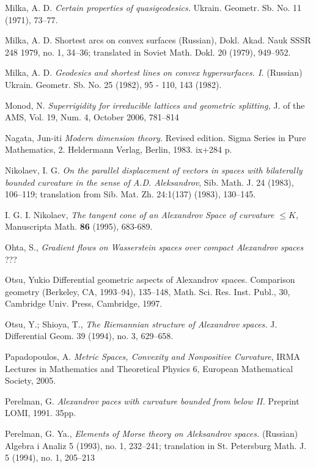 \begin{thebibliography}{52}
Milka, A. D. \textit{Certain properties of quasigeodesics.} 
Ukrain. Geometr. Sb. No. 11 (1971), 73--77.

 {Milka, A. D.} {Shortest arcs on convex surfaces} (Russian),  {Dokl. Akad.
Nauk SSSR}  {248}  {1979}, {no. 1}, {34--36};  translated in  Soviet Math. Dokl. 20 (1979), 949--952.

 Milka, A. D.  \textit{Geodesics and shortest lines on convex hypersurfaces.  I.}  (Russian)   Ukrain. Geometr. Sb. No. 25
(1982), 95 - 110, 143 (1982).

 Monod, N. \textit{Superrigidity for irreducible lattices and geometric splitting,} J. of the AMS,
Vol. 19, Num. 4, October 2006, 781--814

 Nagata, Jun-iti \textit{Modern dimension theory.} Revised edition. Sigma Series in Pure Mathematics, 2. Heldermann Verlag, Berlin, 1983. ix+284 p.

 Nikolaev, I. G. \textit{On the parallel displacement of vectors in spaces with
bilaterally bounded curvature in the sense of A.D. Aleksandrov}, Sib. Math.
J. 24 (1983), 106--119; translation from Sib. Mat. Zh. 24:1(137) (1983), 130--145.

 I. G. I. Nikolaev, {\em The tangent cone of an Alexandrov Space of curvature $\le K$}, Manuscripta Math. {\bf 86} (1995), 683-689.

 Ohta, S., \textit{Gradient flows on Wasserstein spaces
over compact Alexandrov spaces} ???

 Otsu, Yukio Differential geometric aspects of Alexandrov spaces.  Comparison
geometry (Berkeley, CA, 1993--94),  135--148, Math. Sci. Res. Inst. Publ., 30,
Cambridge Univ. Press, Cambridge, 1997.

 Otsu, Y.; Shioya, T., \textit{The Riemannian structure of Alexandrov spaces.}  J. Differential Geom.  39  (1994),  no. 3, 629--658.

  Papadopoulos, A.
\textit{Metric Spaces, Convexity and Nonpositive Curvature},
IRMA Lectures in Mathematics and Theoretical Physics 6, European Mathematical Society, 2005. 


 Perelman, G. \textit{Alexandrov paces with curvature
bounded from below II.} Preprint LOMI, 1991. 35pp.

Perelman, G. Ya., \textit{Elements of Morse theory on
Aleksandrov spaces.} (Russian)  Algebra i Analiz  5  (1993),  no. 1, 232--241; 
translation in  St. Petersburg Math. J.  5  (1994),  no. 1, 205--213


\end{thebibliography}

